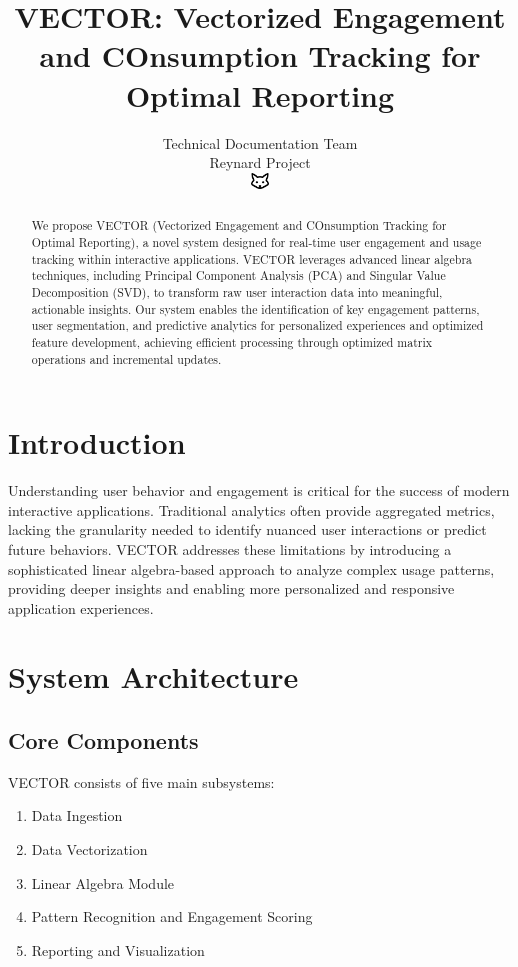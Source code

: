 \documentclass[10pt]{article}
\begin{document}
\title{VECTOR: Vectorized Engagement and COnsumption Tracking for Optimal Reporting}

\author{Technical Documentation Team\\
Reynard Project\\
\includegraphics[width=0.5cm]{favicon.pdf}}

\maketitle

\begin{abstract}
We propose VECTOR (Vectorized Engagement and COnsumption Tracking for Optimal Reporting), a novel system designed for real-time user engagement and usage tracking within interactive applications. VECTOR leverages advanced linear algebra techniques, including Principal Component Analysis (PCA) and Singular Value Decomposition (SVD), to transform raw user interaction data into meaningful, actionable insights. Our system enables the identification of key engagement patterns, user segmentation, and predictive analytics for personalized experiences and optimized feature development, achieving efficient processing through optimized matrix operations and incremental updates.
\end{abstract}

\section{Introduction}
Understanding user behavior and engagement is critical for the success of modern interactive applications. Traditional analytics often provide aggregated metrics, lacking the granularity needed to identify nuanced user interactions or predict future behaviors. VECTOR addresses these limitations by introducing a sophisticated linear algebra-based approach to analyze complex usage patterns, providing deeper insights and enabling more personalized and responsive application experiences.

\section{System Architecture}
\subsection{Core Components}
VECTOR consists of five main subsystems:
\begin{enumerate}
    \item Data Ingestion
    \item Data Vectorization
    \item Linear Algebra Module
    \item Pattern Recognition and Engagement Scoring
    \item Reporting and Visualization
\end{enumerate}
\end{document}
